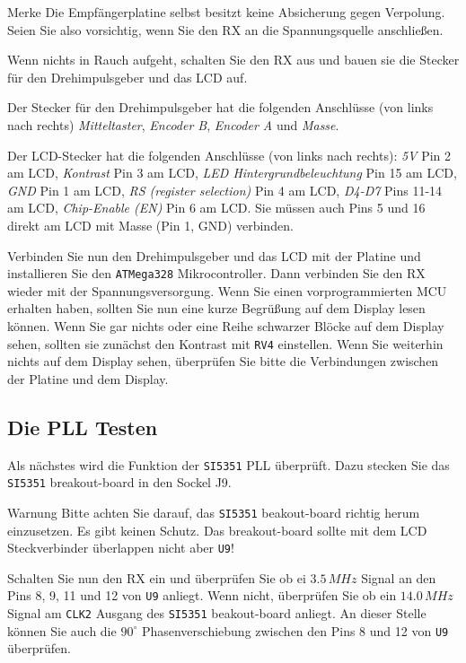 \documentclass[10pt, a4paper,twoside]{scrartcl}
\newenvironment{remember}{\begin{bclogo}[couleur=blue!30,arrondi=.1,logo=\bccrayon,ombre=true]{Merke}}{\end{bclogo}}
\newenvironment{warning}{\begin{bclogo}[couleur=red!30,arrondi=.1,logo=\bcattention,ombre=true]{Warnung}}{\end{bclogo}}
\begin{document}
\begin{remember}
 Die Empfängerplatine selbst besitzt keine Absicherung gegen Verpolung. Seien Sie also vorsichtig, wenn Sie den RX an die Spannungsquelle anschließen.
\end{remember}

 Wenn nichts in Rauch aufgeht, schalten Sie den RX aus und bauen sie die Stecker für den Drehimpulsgeber und das LCD auf.  

 Der Stecker für den Drehimpulsgeber hat die folgenden Anschlüsse (von links nach rechts) \emph{Mitteltaster}, \emph{Encoder B}, \emph{Encoder A} und \emph{Masse}.

 Der LCD-Stecker hat die folgenden Anschlüsse (von links nach rechts): \emph{5V} Pin 2 am LCD, \emph{Kontrast} Pin 3 am LCD, \emph{LED Hintergrundbeleuchtung} Pin 15 am LCD, \emph{GND} Pin 1 am LCD, \emph{RS (register selection)} Pin 4 am LCD, \emph{D4-D7} Pins 11-14 am LCD, \emph{Chip-Enable (EN)} Pin 6 am LCD. Sie müssen auch Pins 5 und 16 direkt am LCD mit Masse (Pin 1, GND) verbinden.
 
 Verbinden Sie nun den Drehimpulsgeber und das LCD mit der Platine und installieren Sie den \texttt{ATMega328} Mikrocontroller. Dann verbinden Sie den RX wieder mit der Spannungsversorgung. Wenn Sie einen vorprogrammierten MCU erhalten haben, sollten Sie nun eine kurze Begrüßung auf dem Display lesen können. Wenn Sie gar nichts oder eine Reihe schwarzer Blöcke auf dem Display sehen, sollten sie zunächst den Kontrast mit \texttt{RV4} einstellen. Wenn Sie weiterhin nichts auf dem Display sehen, überprüfen Sie bitte die Verbindungen zwischen der Platine und dem Display.

\subsection{Die PLL Testen}
 Als nächstes wird die Funktion der \texttt{SI5351} PLL überprüft. Dazu stecken Sie das \texttt{SI5351} breakout-board in den Sockel J9.

\begin{warning}
 Bitte achten Sie darauf, das \texttt{SI5351} beakout-board richtig herum einzusetzen. Es gibt keinen Schutz. Das breakout-board sollte mit dem LCD Steckverbinder überlappen nicht aber \texttt{U9}!
\end{warning}
 
 Schalten Sie nun den RX ein und überprüfen Sie ob ei $3.5\,MHz$ Signal an den Pins 8, 9, 11 und 12 von \texttt{U9} anliegt. Wenn nicht, überprüfen Sie ob ein $14.0\,MHz$ Signal am \texttt{CLK2} Ausgang des \texttt{SI5351} beakout-board anliegt. An dieser Stelle können Sie auch die $90^\circ$ Phasenverschiebung zwischen den Pins 8 und 12 von \texttt{U9} überprüfen.
\end{document}
